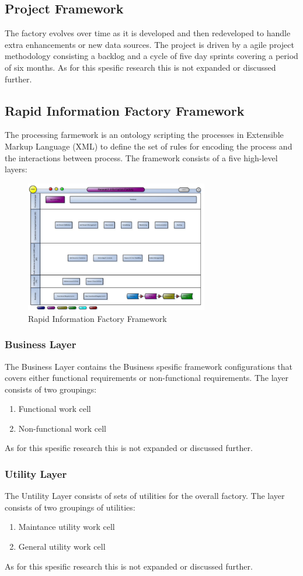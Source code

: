 \documentclass{sigplanconf}
\begin{document}
\subsection{Project Framework} 
The factory evolves over time as it is developed and then redeveloped to handle extra enhancements or new data sources. The project is driven by a agile project methodology consisting a backlog and a cycle of five day sprints covering a period of six months. As for this spesific research this is not expanded or discussed further.
\subsection{Rapid Information Factory Framework}
The processing farmework is an ontology scripting the processes in Extensible Markup Language (XML) to define the set of rules for encoding the process and the interactions between process. The framework consists of a five high-level layers:
\begin{figure}
  \centering
  \includegraphics[width=8cm]{RIFF1}
  \caption{Rapid Information Factory Framework}
\end{figure}
\subsubsection{Business Layer}
The Business Layer contains the Business spesific framework configurations that covers either functional requirements or non-functional requirements. The layer consists of two groupings:
\begin{enumerate}
  \item Functional work cell
  \item Non-functional work cell
\end{enumerate}
As for this spesific research this is not expanded or discussed further.
\subsubsection{Utility Layer}
The Untility Layer consists of sets of utilities for the overall factory. The layer consists of two groupings of utilities:
\begin{enumerate}
  \item Maintance utility work cell
  \item General utility work cell
\end{enumerate}
As for this spesific research this is not expanded or discussed further.
\end{document}
